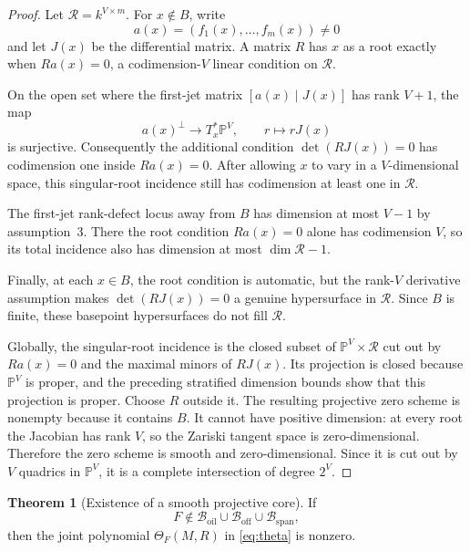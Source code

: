 \documentclass[11pt,a4paper]{article}
\theoremstyle{definition}
\newtheorem{theorem}{Theorem}[section]
\theoremstyle{remark}
\newcommand{\PP}{\mathbb P}
\newcommand{\cB}{\mathcal B}
\newcommand{\cR}{\mathcal R}
\newcommand{\oil}{\mathrm{oil}}
\newcommand{\off}{\mathrm{off}}
\newcommand{\spanbad}{\mathrm{span}}
\begin{document}
\begin{proof}
Let $\cR=k^{V\times m}$.  For $x\notin B$, write
\[
a(x)=(f_1(x),\ldots,f_m(x))\ne0
\]
and let $J(x)$ be the differential matrix.  A matrix $R$ has $x$ as a root exactly when $Ra(x)=0$, a codimension-$V$ linear condition on $\cR$.

On the open set where the first-jet matrix $[a(x)\mid J(x)]$ has rank $V+1$, the map
\[
a(x)^\perp\longrightarrow T_x^*\PP^V,
\qquad
r\longmapsto rJ(x)
\]
is surjective.  Consequently the additional condition $\det(RJ(x))=0$ has codimension one inside $Ra(x)=0$.  After allowing $x$ to vary in a $V$-dimensional space, this singular-root incidence still has codimension at least one in $\cR$.

The first-jet rank-defect locus away from $B$ has dimension at most $V-1$ by assumption~3.  There the root condition $Ra(x)=0$ alone has codimension $V$, so its total incidence also has dimension at most $\dim\cR-1$.

Finally, at each $x\in B$, the root condition is automatic, but the rank-$V$ derivative assumption makes $\det(RJ(x))=0$ a genuine hypersurface in $\cR$.  Since $B$ is finite, these basepoint hypersurfaces do not fill $\cR$.

Globally, the singular-root incidence is the closed subset of $\PP^V\times\cR$ cut out by $Ra(x)=0$ and the maximal minors of $RJ(x)$.  Its projection is closed because $\PP^V$ is proper, and the preceding stratified dimension bounds show that this projection is proper.  Choose $R$ outside it.  The resulting projective zero scheme is nonempty because it contains $B$.  It cannot have positive dimension: at every root the Jacobian has rank $V$, so the Zariski tangent space is zero-dimensional.  Therefore the zero scheme is smooth and zero-dimensional.  Since it is cut out by $V$ quadrics in $\PP^V$, it is a complete intersection of degree $2^V$.
\end{proof}

\begin{theorem}[Existence of a smooth projective core]\label{thm:joint-nonzero}
If
\[
F\notin\cB_{\oil}\cup\cB_{\off}\cup\cB_{\spanbad},
\]
then the joint polynomial $\Theta_F(M,R)$ in \eqref{eq:theta} is nonzero.
\end{theorem}
\end{document}
